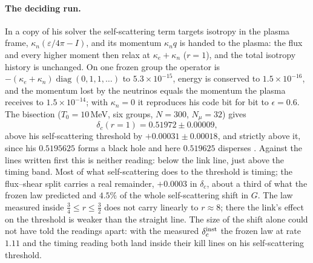 \paragraph{The deciding run.} In a copy of his solver the self-scattering term targets isotropy in the plasma frame, $\kappa_n(\varepsilon/4\pi-I)$, and its momentum $\kappa_nq$ is handed to the plasma: the flux and every higher moment then relax at $\kappa_e+\kappa_n$ ($r=1$), and the total isotropy history is unchanged. On one frozen group the operator is $-(\kappa_e+\kappa_n)\operatorname{diag}(0,1,1,\dots)$ to $5.3\times10^{-15}$, energy is conserved to $1.5\times10^{-16}$, and the momentum lost by the neutrinos equals the momentum the plasma receives to $1.5\times10^{-14}$; with $\kappa_n=0$ it reproduces his code bit for bit to $\epsilon=0.6$. The bisection ($T_0=10$\,MeV, six groups, $N=300$, $N_\mu=32$) gives
\begin{equation}
\delta_c(r=1)=0.51972\pm0.00009,
\end{equation}
above his self-scattering threshold by $+0.00031\pm0.00018$, and strictly above it, since his $0.5195625$ forms a black hole and here $0.519625$ disperses . Against the lines written first this is neither reading: below the link line, just above the timing band. Most of what self-scattering does to the threshold is timing; the flux--shear split carries a real remainder, $+0.0003$ in $\delta_c$, about a third of what the frozen law predicted and $4.5\%$ of the whole self-scattering shift in $G$. The law measured inside $\tfrac34\le r\le\tfrac32$ does not carry linearly to $r\approx8$; there the link's effect on the threshold is weaker than the straight line. The size of the shift alone could not have told the readings apart: with the measured $\delta_c^{\rm inst}$ the frozen law at rate $1.11$ and the timing reading both land inside their kill lines on his self-scattering threshold.

